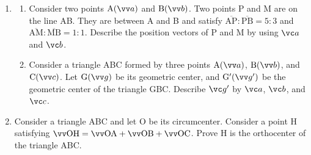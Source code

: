 \documentclass[11pt,pdfa,lastpage]{MishoNote}
\begin{document}
\begin{enumerate}[start=3]
\item[\GB{\sffamily\bfseries[12]}] \begin{enumerate}[leftmargin=1.5em,labelsep=-0.3em]
    \item Consider two points $\posvec Aa$ and $\posvec Bb$. Two points P and M are on the line AB. They are between A and B and satisfy $\overline{\mathrm{AP}}:\overline{\mathrm{PB}}=5:3$ and $\overline{\mathrm{AM}}:\overline{\mathrm{MB}}=1:1$. Describe the position vectors of P and M by using $\vc a$ and $\vc b$.
\item Consider a triangle ABC formed by three points $\posvec Aa$, $\posvec Bb$, and $\posvec Cc$. Let $\posvec Gg$ be its geometric center, and $\posvec{G'}{g'}$ be the geometric center of the triangle GBC. Describe $\vc g'$ by $\vc a$, $\vc b$, and $\vc c$.
\end{enumerate}
\item[\GC{\sffamily\bfseries[15]}] Consider a triangle ABC and let O be its circumcenter. Consider a point H satisfying $\vvv{OH}=\vvv{OA}+\vvv{OB}+\vvv{OC}$. Prove H is the orthocenter of the triangle ABC.
\end{enumerate}
\endgroup
\end{document}
